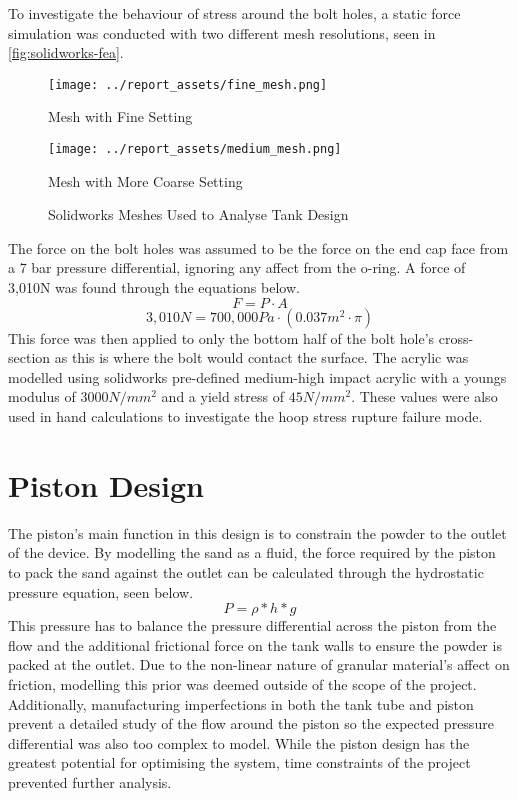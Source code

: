 To investigate the behaviour of stress around the bolt holes, a static force simulation was conducted with two different mesh resolutions, seen in \autoref{fig:solidworks-fea}. 
\begin{figure}[htbp]
    \centering

    \begin{minipage}{0.45\textwidth}
        \centering
        \texttt{[image: ../report\_assets/fine\_mesh.png]}
        \caption*{Mesh with Fine Setting}
    \end{minipage}
    \hfill
    \begin{minipage}{0.45\textwidth}
        \centering
        \texttt{[image: ../report\_assets/medium\_mesh.png]}
        \caption*{Mesh with More Coarse Setting}
    \end{minipage}
    \caption{Solidworks Meshes Used to Analyse Tank Design}\label{fig:solidworks-fea}
\end{figure}
The force on the bolt holes was assumed to be the force on the end cap face from a 7 bar pressure differential, ignoring any affect from the o-ring. A force of 3,010N was found through the equations below.
\[
F = P \cdot A
\]
\[
3,010N = 700,000Pa \cdot (0.037m^2 \cdot \pi)
\]
This force was then applied to only the bottom half of the bolt hole's cross-section as this is where the bolt would contact the surface. The acrylic was modelled using solidworks pre-defined medium-high impact acrylic with a youngs modulus of $3000 N/mm^2$ and a yield stress of $45 N/mm^2$. These values were also used in hand calculations to investigate the hoop stress rupture failure mode.

\section{Piston Design}\label{sec:piston}
The piston's main function in this design is to constrain the powder to the outlet of the device. By modelling the sand as a fluid, the force required by the piston to pack the sand against the outlet can be calculated through the hydrostatic pressure equation, seen below. 
\[
P = \rho * h * g
\]
This pressure has to balance the pressure differential across the piston from the flow and the additional frictional force on the tank walls to ensure the powder is packed at the outlet. Due to the non-linear nature of granular material's affect on friction, modelling this prior was deemed outside of the scope of the project. Additionally, manufacturing imperfections in both the tank tube and piston prevent a detailed study of the flow around the piston so the expected pressure differential was also too complex to model. While the piston design has the greatest potential for optimising the system, time constraints of the project prevented further analysis.

